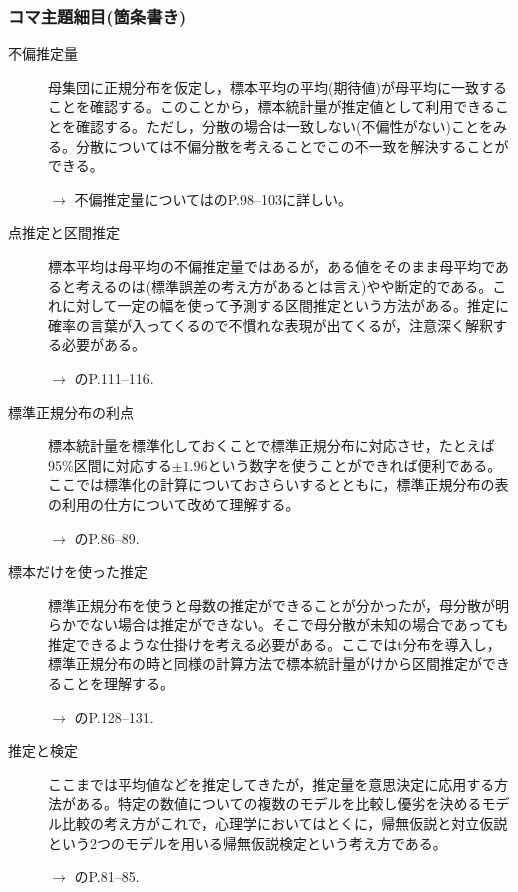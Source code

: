 \subsubsection{コマ主題細目(箇条書き)}
\begin{description}

	\item[不偏推定量]母集団に正規分布を仮定し，標本平均の平均(期待値)が母平均に一致することを確認する。このことから，標本統計量が推定値として利用できることを確認する。ただし，分散の場合は一致しない(不偏性がない)ことをみる。分散については不偏分散を考えることでこの不一致を解決することができる。
	      \begin{flushright}
		      $\to$ 不偏推定量については\textcite{Yamada2004}のP.98--103に詳しい。
	      \end{flushright}

	\item[点推定と区間推定]標本平均は母平均の不偏推定量ではあるが，ある値をそのまま母平均であると考えるのは(標準誤差の考え方があるとは言え)やや断定的である。これに対して一定の幅を使って予測する区間推定という方法がある。推定に確率の言葉が入ってくるので不慣れな表現が出てくるが，注意深く解釈する必要がある。
	      \begin{flushright}
		      $\to$ \textcite{Kawabata201408}のP.111--116.
	      \end{flushright}

	\item[標準正規分布の利点]標本統計量を標準化しておくことで標準正規分布に対応させ，たとえば95\%区間に対応する$\pm 1.96$という数字を使うことができれば便利である。ここでは標準化の計算についておさらいするとともに，標準正規分布の表の利用の仕方について改めて理解する。
	      \begin{flushright}
		      $\to$ \textcite{Yamada2004}のP.86--89.
	      \end{flushright}

	\item[標本だけを使った推定]標準正規分布を使うと母数の推定ができることが分かったが，母分散が明らかでない場合は推定ができない。そこで母分散が未知の場合であっても推定できるような仕掛けを考える必要がある。ここではt分布を導入し，標準正規分布の時と同様の計算方法で標本統計量がけから区間推定ができることを理解する。

	      \begin{flushright}
		      $\to$ \textcite{Yamada2004}のP.128--131.
	      \end{flushright}


	\item[推定と検定]ここまでは平均値などを推定してきたが，推定量を意思決定に応用する方法がある。特定の数値についての複数のモデルを比較し優劣を決めるモデル比較の考え方がこれで，心理学においてはとくに，帰無仮説と対立仮説という2つのモデルを用いる帰無仮説検定という考え方である。
	      \begin{flushright}
		      $\to$ \textcite{Kawabata201408}のP.81--85.
	      \end{flushright}


\end{description}
